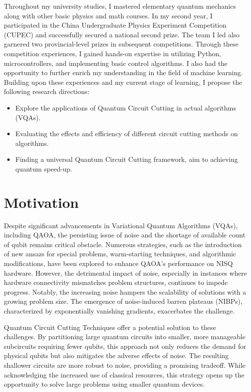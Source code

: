 \documentclass[]{article}
\begin{document}
Throughout my university studies, I mastered elementary quantum mechanics along with other basic physics and math courses. In my second year, I participated in the China Undergraduate Physics Experiment Competition (CUPEC) and successfully secured a national second prize\cite{CUPEC}. The team I led also garnered two provincial-level prizes in subsequent competitions. Through these competition experiences, I gained hands-on expertise in utilizing Python, microcontrollers, and implementing basic control algorithms. I also had the opportunity to further enrich my understanding in the field of machine learning. Building upon these experiences and my current stage of learning, I propose the following research directions: 
\begin{itemize}
	\item Explore the applications of Quantum Circuit Cutting in actual algorithms (VQAs).
	\item Evaluating the effects and efficiency of different circuit cutting methods on algorithms.
	\item Finding a universal Quantum Circuit Cutting framework, aim to achieving quantum speed-up.
\end{itemize}

\section{Motivation}

Despite significant advancements in Variational Quantum Algorithms (VQAs), including QAOA, the persisting issue of noise and the shortage of available count of qubit remains critical obstacle\cite{In1, In2}. Numerous strategies, such as the introduction of new ansazs for special problems\cite{Qian_2023,vijendran2023expressive,Li_2020}, warm-starting techniques\cite{Egger_2021, beaulieu2022evaluating}, and algorithmic modifications\cite{herrman2021multiangle, Bartschi_2020}, have been explored to enhance QAOA's performance on NISQ hardware. However, the detrimental impact of noise, especially in instances where hardware connectivity mismatches problem structures, continues to impede progress. Notably, the increasing noise hampers the scalability of solutions with a growing problem size. The emergence of noise-induced barren plateaus (NIBPs)\cite{In2,Wang_2021}, characterized by exponentially vanishing gradients, exacerbates the challenge.

Quantum Circuit Cutting Techniques offer a potential solution to these challenges. By partitioning large quantum circuits into smaller, more manageable subcircuits requiring fewer qubits, this approach not only reduces the demand for physical qubits but also mitigates the adverse effects of noise. The resulting shallower circuits are more robust to noise\cite{QDCA, CutQC}, providing a promising tradeoff. While acknowledging the increased use of classical resources, this strategy opens up the opportunity to solve large problems using smaller quantum devices.
\end{document}
